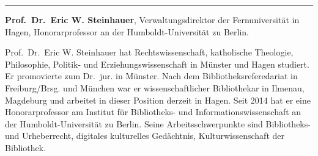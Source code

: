 \documentclass[a4paper,
fontsize=11pt,
oneside,
numbers=noperiodatend,
parskip=half-,
bibliography=totoc,
final
]{scrartcl}
\begin{document}
\begin{center}\rule{0.5\linewidth}{\linethickness}\end{center}

\textbf{Prof.~Dr.~Eric W. Steinhauer}, Verwaltungsdirektor der
Fernuniversität in Hagen, Honorarprofessor an der Humboldt-Universität
zu Berlin.

Prof.~Dr.~Eric W. Steinhauer hat Rechtswissenschaft, katholische
Theologie, Philosophie, Politik- und Erziehungswissenschaft in Münster
und Hagen studiert. Er promovierte zum Dr.~jur. in Münster. Nach dem
Bibliotheksreferedariat in Freiburg/Brsg. und München war er
wissenschaftlicher Bibliothekar in Ilmenau, Magdeburg und arbeitet in
dieser Position derzeit in Hagen. Seit 2014 hat er eine Honorarprofessor
am Institut für Bibliotheks- und Informationswissenschaft an der
Humboldt-Universität zu Berlin. Seine Arbeitsschwerpunkte sind
Bibliotheks- und Urheberrecht, digitales kulturelles Gedächtnis,
Kulturwissenschaft der Bibliothek.
\end{document}
